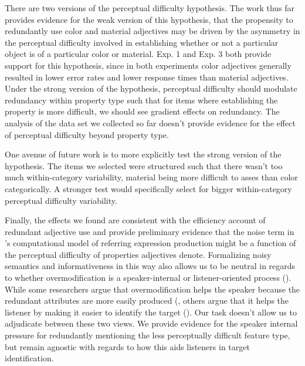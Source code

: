 \documentclass[12pt,letterpaper]{article}
\begin{document}
There are two versions of the perceptual difficulty hypothesis. The work thus far provides evidence for the weak version of this hypothesis, that the propensity to redundantly use color and material adjectives may be driven by the asymmetry in the perceptual difficulty involved in establishing whether or not a particular object is of a particular color or material. Exp. 1 and Exp. 3 both provide support for this hypothesis, since in both experiments color adjectives generally resulted in lower error rates and lower response times than material adjectives. Under the strong version of the hypothesis, perceptual difficulty should modulate redundancy within property type such that for items where establishing the property is more difficult, we should see gradient effects on redundancy. The analysis of the data set we collected so far doesn't provide evidence for the effect of perceptual difficulty beyond property type. 

One avenue of future work is to more explicitly test the strong version of the hypothesis. The items we selected were structured such that there wasn't too much within-category variability, material being more difficult to asses than color categorically. A stronger test would specifically select for bigger within-category perceptual difficulty variability.

Finally, the effects we found are consistent with the efficiency account of redundant adjective use and provide preliminary evidence that the noise term in \citet{DegenEtAl2020}'s computational model of referring expression production might be a function of the perceptual difficulty of properties adjectives denote. Formalizing noisy semantics and informativeness in this way also allows us to be neutral in regards to whether overmodification is a speaker-internal or listener-oriented process (\citealt{Arnold2008}). While some researchers argue that overmodification helps the speaker because the redundant attributes are more easily produced (\citealt{DaviesKatsos2013, KoolenEtAl2013}, others argue that it helps the listener by making it easier to identify the target (\citealt{FussellKraus1989a, ArtsEtAl2011,RubioFernandez2016}). Our task doesn't allow us to adjudicate between these two views. We provide evidence for the speaker internal pressure for redundantly mentioning the less perceptually difficult feature type, but remain agnostic with regards to how this aids listeners in target identification.
\end{document}
